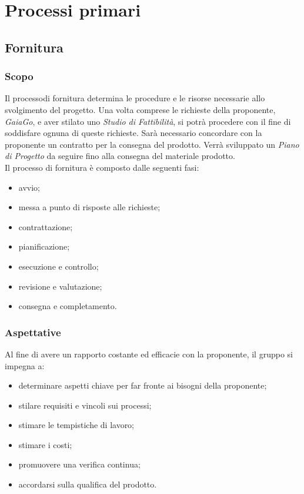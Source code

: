\section{Processi primari}
\subsection{Fornitura}
\subsubsection{Scopo}
Il processo\glosp di fornitura determina le procedure e le risorse necessarie allo svolgimento del progetto. Una volta comprese le richieste della proponente, \textit{GaiaGo}, e aver stilato uno \textit{Studio di Fattibilità}, si potrà procedere con il fine di soddisfare ognuna di queste richieste. Sarà necessario concordare con la proponente un contratto per la consegna del prodotto. Verrà sviluppato un \textit{Piano di Progetto} da seguire fino alla consegna del materiale prodotto. \\
	Il processo di fornitura è composto dalle seguenti fasi:
	\begin{itemize}
		\item avvio;
		\item messa a punto di risposte alle richieste;
		\item contrattazione;
		\item pianificazione;
		\item esecuzione e controllo;
		\item revisione e valutazione;
		\item consegna e completamento.
	\end{itemize}
	\subsubsection{Aspettative}
	Al fine di avere un rapporto costante ed efficacie con la proponente, il gruppo si impegna a:
	\begin{itemize}
		\item determinare aspetti chiave per far fronte ai bisogni della proponente;
		\item stilare requisiti e vincoli sui processi;
		\item stimare le tempistiche di lavoro;
		\item stimare i costi;
		\item promuovere una verifica continua;		
		\item accordarsi sulla qualifica del prodotto.
	\end{itemize}

